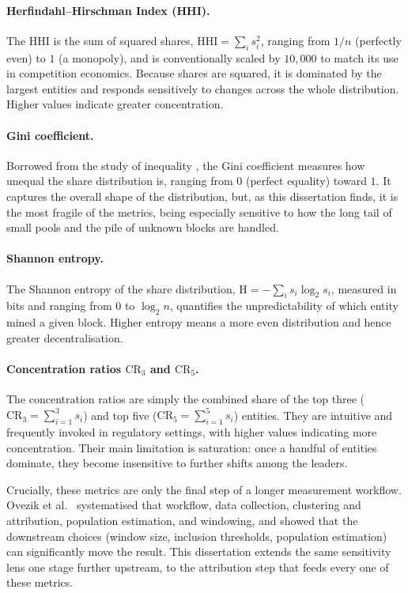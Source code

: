 \documentclass[logo,msc]{infthesis}           %
\begin{document}
\paragraph{Herfindahl--Hirschman Index (HHI).}
The HHI is the sum of squared shares,
$\mathrm{HHI} = \sum_{i} s_i^2$,
ranging from $1/n$ (perfectly even) to $1$ (a monopoly), and is conventionally
scaled by $10{,}000$ to match its use in competition economics. Because shares
are squared, it is dominated by the largest entities and responds sensitively
to changes across the whole distribution. Higher values indicate greater
concentration.
 
\paragraph{Gini coefficient.}
Borrowed from the study of inequality \cite{gini1912variabilita}, the Gini
coefficient measures how unequal the share distribution is, ranging from $0$
(perfect equality) toward $1$. It captures the overall shape of the
distribution, but, as this dissertation finds, it is the most fragile of
the metrics, being especially sensitive to how the long tail of small pools and
the pile of unknown blocks are handled.
 
\paragraph{Shannon entropy.}
The Shannon entropy of the share distribution,
$\mathrm{H} = -\sum_{i} s_i \log_2 s_i$,
measured in bits and ranging from $0$ to $\log_2 n$, quantifies the
unpredictability of which entity mined a given block. Higher entropy means a
more even distribution and hence greater decentralisation.
 
\paragraph{Concentration ratios $\mathrm{CR}_3$ and $\mathrm{CR}_5$.}
The concentration ratios are simply the combined share of the top three
($\mathrm{CR}_3 = \sum_{i=1}^{3} s_i$) and top five
($\mathrm{CR}_5 = \sum_{i=1}^{5} s_i$) entities. They are intuitive and
frequently invoked in regulatory settings, with higher values indicating more
concentration. Their main limitation is saturation: once a handful of entities
dominate, they become insensitive to further shifts among the leaders.
 
Crucially, these metrics are only the final step of a longer measurement
workflow. Ovezik et al.~\cite{ovezik2025sok} systematised that workflow,
data collection, clustering and attribution, population estimation, and
windowing, and showed that the downstream choices (window size, inclusion
thresholds, population estimation) can significantly move the result. This
dissertation extends the same sensitivity lens one stage further upstream, to
the attribution step that feeds every one of these metrics.
 
\end{document}
